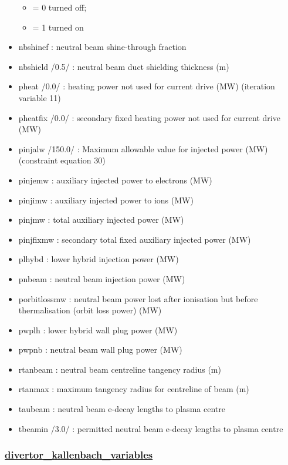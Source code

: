\documentclass[]{article}
\providecommand{\tightlist}{%
  \setlength{\itemsep}{0pt}\setlength{\parskip}{0pt}}
\begin{document}
\begin{itemize}
  \begin{itemize}
  \tightlist
  \item
    = 0 turned off;
  \item
    = 1 turned on
  \end{itemize}
\item
  nbshinef : neutral beam shine-through fraction
\item
  nbshield /0.5/ : neutral beam duct shielding thickness (m)
\item
  pheat /0.0/ : heating power not used for current drive (MW) (iteration
  variable 11)
\item
  pheatfix /0.0/ : secondary fixed heating power not used for current
  drive (MW)
\item
  pinjalw /150.0/ : Maximum allowable value for injected power (MW)
  (constraint equation 30)
\item
  pinjemw : auxiliary injected power to electrons (MW)
\item
  pinjimw : auxiliary injected power to ions (MW)
\item
  pinjmw : total auxiliary injected power (MW)
\item
  pinjfixmw : secondary total fixed auxiliary injected power (MW)
\item
  plhybd : lower hybrid injection power (MW)
\item
  pnbeam : neutral beam injection power (MW)
\item
  porbitlossmw : neutral beam power lost after ionisation but before
  thermalisation (orbit loss power) (MW)
\item
  pwplh : lower hybrid wall plug power (MW)
\item
  pwpnb : neutral beam wall plug power (MW)
\item
  rtanbeam : neutral beam centreline tangency radius (m)
\item
  rtanmax : maximum tangency radius for centreline of beam (m)
\item
  taubeam : neutral beam e-decay lengths to plasma centre
\item
  tbeamin /3.0/ : permitted neutral beam e-decay lengths to plasma
  centre
\end{itemize}

\subsubsection{\texorpdfstring{\href{divertor_kallenbach_variables.html}{divertor\_kallenbach\_variables}}{divertor\_kallenbach\_variables}}\label{divertor_kallenbach_variables}
\end{document}
